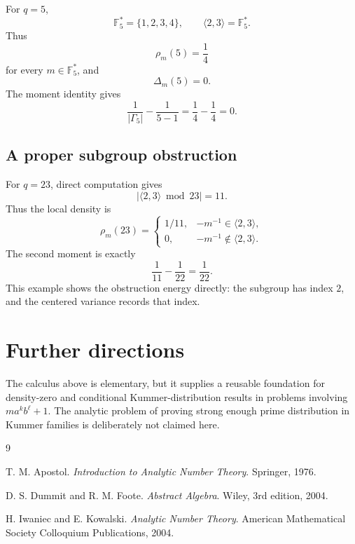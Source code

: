 \documentclass[11pt]{article}
\newcommand{\F}{\mathbb F}
\newcommand{\1}{\mathbf 1}
\begin{document}
For \(q=5\),
\[
\F_5^*=\{1,2,3,4\},\qquad \langle2,3\rangle=\F_5^*.
\]
Thus
\[
\rho_m(5)=\frac1{4}
\]
for every \(m\in\F_5^*\), and
\[
\Delta_m(5)=0.
\]
The moment identity gives
\[
\frac1{|\Gamma_5|}-\frac1{5-1}
=
\frac14-\frac14
=
0.
\]

\subsection{A proper subgroup obstruction}

For \(q=23\), direct computation gives
\[
|\langle2,3\rangle\bmod23|=11.
\]
Thus the local density is
\[
\rho_m(23)=
\begin{cases}
1/11,& -m^{-1}\in\langle2,3\rangle,\\
0,& -m^{-1}\notin\langle2,3\rangle.
\end{cases}
\]
The second moment is exactly
\[
\frac1{11}-\frac1{22}
=
\frac1{22}.
\]
This example shows the obstruction energy directly: the subgroup has index \(2\), and the centered variance records that index.

\section{Further directions}

The calculus above is elementary, but it supplies a reusable foundation for density-zero and conditional Kummer-distribution results in problems involving \(m a^k b^\ell+1\).  The analytic problem of proving strong enough prime distribution in Kummer families is deliberately not claimed here.

\begin{thebibliography}{9}

T. M. Apostol.
\newblock \emph{Introduction to Analytic Number Theory}.
\newblock Springer, 1976.

D. S. Dummit and R. M. Foote.
\newblock \emph{Abstract Algebra}.
\newblock Wiley, 3rd edition, 2004.

H. Iwaniec and E. Kowalski.
\newblock \emph{Analytic Number Theory}.
\newblock American Mathematical Society Colloquium Publications, 2004.

\end{thebibliography}
\end{document}
